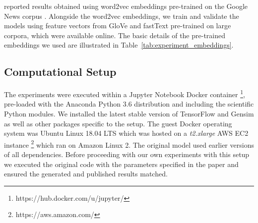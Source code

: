 \citeauthor{ustalov2017negative} reported results obtained using word2vec embeddings pre-trained on the Google News corpus \citep{mikolov2013efficient}.  Alongside the word2vec embeddings, we train and validate the models using feature vectors from GloVe \citep{pennington2014glove} and fastText \citep{bojanowski2017enriching} pre-trained on large corpora, which were available online.  The basic details of the pre-trained embeddings we used are illustrated in Table~\ref{tab:experiment_embeddings}.

\subsection{Computational Setup}
The experiments were executed within a Jupyter Notebook Docker container \footnote{https://hub.docker.com/u/jupyter/}, pre-loaded with the Anaconda Python 3.6 distribution and including the scientific Python modules.  We installed the latest stable version of TensorFlow \citep{tensorflow2015-whitepaper} and Gensim \citep{rehurek_lrec} as well as other packages specific to the \citep{ustalov2017negative} setup.  The guest Docker operating system was Ubuntu Linux 18.04 LTS which was hosted on a \textit{t2.xlarge} AWS EC2 instance \footnote{https://aws.amazon.com/} which ran on Amazon Linux 2.  The original model used earlier versions of all dependencies.  Before proceeding with our own experiments with this setup we executed the original code with the parameters specified in the paper and ensured the generated and published results matched.


